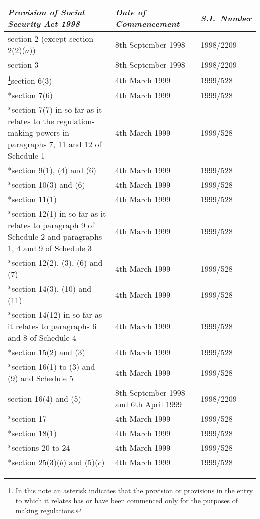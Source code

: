 \documentclass[12pt,a4paper]{article}
\begin{document}
{\footnotesize
\noindent
\begin{longtable}{p{193.78079pt}p{78.37471pt}p{81.83215pt}}
\hline
\itshape Provision of Social Security Act 1998	& \itshape Date of Commencement	& \itshape S.I.\ Number\\
\hline
\endhead
\hline
\endlastfoot
section 2 (except section 2(2)($a$))	&8th September 1998	&1998/2209\\
section 3	&8th September 1998	&1998/2209\\
{}\footnote{\frenchspacing In this note an asterisk indicates that the provision or provisions in the entry to which it relates has or have been commenced only for the purposes of making regulations.}section 6(3)&	4th March 1999&	1999/528\\
{}*section 7(6)	&4th March 1999	&1999/528\\
{}*section 7(7) in so far as it relates to the regulation-making powers in paragraphs 7, 11 and 12 of Schedule 1	&4th March 1999	&1999/528\\
{}*section 9(1), (4) and (6)	&4th March 1999	&1999/528\\
{}*section 10(3) and (6)	&4th March 1999	&1999/528\\
{}*section 11(1)	&4th March 1999	&1999/528\\
{}*section 12(1) in so far as it relates to paragraph 9 of Schedule 2 and paragraphs 1, 4 and 9 of Schedule 3	&4th March 1999	&1999/528\\
{}*section 12(2), (3), (6) and (7)	&4th March 1999	&1999/528\\
{}*section 14(3), (10) and (11)	&4th March 1999	&1999/528\\
{}*section 14(12) in so far as it relates to paragraphs 6 and 8 of Schedule 4	&4th March 1999	&1999/528\\
{}*section 15(2) and (3)	&4th March 1999	&1999/528\\
{}*section 16(1) to (3) and (9) and Schedule 5	&4th March 1999	&1999/528\\
section 16(4) and (5)	&8th September 1998 and 6th April 1999	&1998/2209\\
{}*section 17	&4th March 1999	&1999/528\\
{}*section 18(1)	&4th March 1999	&1999/528\\
{}*sections 20 to 24	&4th March 1999	&1999/528\\
{}*section 25(3)($b$) and (5)($c$)	&4th March 1999	&1999/528\\

\end{longtable}}
\end{document}

